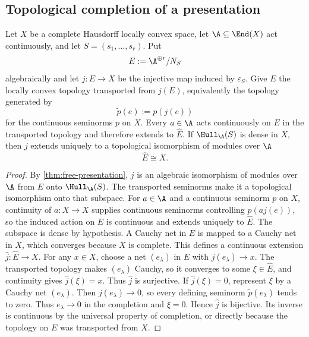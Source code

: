 \subsection{Topological completion of a presentation}
\begin{theorem}
\label{thm:completed-presentation}
Let $X$ be a complete Hausdorff locally convex space, let $\A\subseteq\End(X)$ act continuously, and let $S=(s_1,\ldots,s_r)$.  Put
\[
E:=\A^{\oplus r}/N_S
\]
algebraically and let $j:E\to X$ be the injective map induced by $\varepsilon_S$.  Give $E$ the locally convex topology transported from $j(E)$, equivalently the topology generated by
\[
\widetilde p(e):=p(j(e))
\]
for the continuous seminorms $p$ on $X$.  Every $a\in\A$ acts continuously on $E$ in the transported topology and therefore extends to $\widehat E$.  If $\Hull_{\A}(S)$ is dense in $X$, then $j$ extends uniquely to a topological isomorphism of modules over $\A$
\[
\boxed{\widehat E\cong X.}
\]
\end{theorem}

\begin{proof}
By \cref{thm:free-presentation}, $j$ is an algebraic isomorphism of modules over $\A$ from $E$ onto $\Hull_{\A}(S)$.  The transported seminorms make it a topological isomorphism onto that subspace.  For $a\in\A$ and a continuous seminorm $p$ on $X$, continuity of $a:X\to X$ supplies continuous seminorms controlling $p(aj(e))$, so the induced action on $E$ is continuous and extends uniquely to $\widehat E$.  The subspace is dense by hypothesis.  A Cauchy net in $E$ is mapped to a Cauchy net in $X$, which converges because $X$ is complete.  This defines a continuous extension $\widehat j:\widehat E\to X$.  For any $x\in X$, choose a net $(e_\lambda)$ in $E$ with $j(e_\lambda)\to x$.  The transported topology makes $(e_\lambda)$ Cauchy, so it converges to some $\xi\in\widehat E$, and continuity gives $\widehat j(\xi)=x$.  Thus $\widehat j$ is surjective.  If $\widehat j(\xi)=0$, represent $\xi$ by a Cauchy net $(e_\lambda)$.  Then $j(e_\lambda)\to0$, so every defining seminorm $\widetilde p(e_\lambda)$ tends to zero.  Thus $e_\lambda\to0$ in the completion and $\xi=0$.  Hence $\widehat j$ is bijective.  Its inverse is continuous by the universal property of completion, or directly because the topology on $E$ was transported from $X$.
\end{proof}

